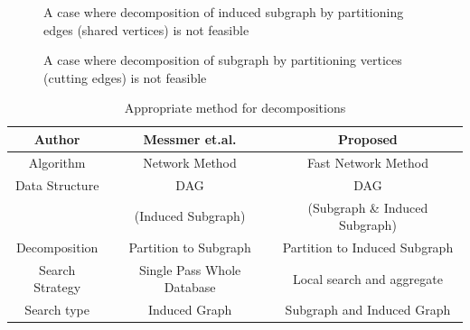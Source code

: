\begin{enumerate}
\begin{enumerate}
\end{enumerate}





\begin{figure}
\centering

\caption{A case where decomposition of induced subgraph by partitioning edges (shared vertices) is not feasible \label{fig:fig66} }
\end{figure}


\begin{figure}
\centering

\caption{A case where decomposition of subgraph by partitioning vertices (cutting edges) is not feasible \label{fig:fig7} }
\end{figure}


\begin{table}
\begin{tabular}{|c|c|c|}
\hline
Author  & Messmer et.al.  & Proposed  \\ \hline
Algorithm & Network Method & Fast Network Method \\ \hline
Data Structure & DAG                 & DAG                            \\ 
               &  (Induced Subgraph) &  (Subgraph \& Induced Subgraph) \\ \hline
Decomposition & Partition to Subgraph & Partition to Induced Subgraph \\ \hline
Search Strategy & Single Pass Whole Database & Local search and aggregate \\ \hline
Search type & Induced Graph & Subgraph and Induced Graph \\ \hline
\end{tabular}
\caption{Appropriate method for decompositions \label{tab:table1} }
\end{table}
